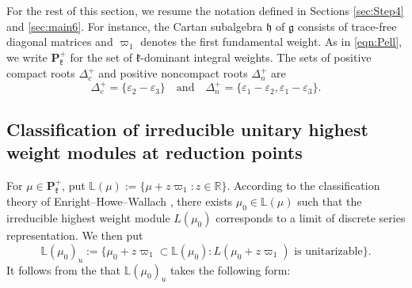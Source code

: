 \documentclass[reqno,11pt]{amsart}
\theoremstyle{remark}
\numberwithin{equation}{section}
\newcommand{\gD}{\Delta}
\newcommand{\eps}{\varepsilon}
\newcommand{\fg}{{\mathfrak g}}
\newcommand{\fh}{{\mathfrak h}}
\newcommand{\fk}{{\mathfrak k}}
\newcommand{\R}{\mathbb{R}}
\begin{document}
For the rest of this section, we resume the notation defined in 
Sections \ref{sec:Step4} and \ref{sec:main6}.
For instance, the Cartan subalgebra $\fh$ of $\fg$ consists of trace-free 
diagonal matrices and
 $\varpi_1$ denotes the first fundamental weight.
As in \eqref{eqn:Pell}, we write 
$\mathbf{P}^+_{\fk}$ for the set of $\fk$-dominant integral weights.
The sets of positive compact roots $\gD^+_c$ 
and positive noncompact roots $\gD^+_n$
are 
\begin{equation*}
\gD^+_c=\{\eps_2-\eps_3\}
\quad 
\text{and}
\quad
\gD^+_n=\{\eps_1-\eps_2, \eps_1-\eps_3\}.
\end{equation*}

\subsection{Classification of irreducible unitary highest weight modules at reduction points}
For $\mu \in \mathbf{P}^+_{\fk}$, put
$\mathbb{L}(\mu):=
\{\mu+z\varpi_1:z \in \R\}$.
According to the classification theory of Enright--Howe--Wallach \cite{EHW83},
there exists $\mu_0 \in \mathbb{L}(\mu)$ such that  
the irreducible highest weight module $L(\mu_0)$
corresponds to a limit of discrete series representation. We then put
\begin{equation*}
\mathbb{L}(\mu_0)_u:=\{\mu_0+z\varpi_1 \subset  \mathbb{L}(\mu_0):
\text{$L(\mu_0+z\varpi_1)$ is unitarizable}\}.
\end{equation*}
It follows from the \cite{EHW83} that $\mathbb{L}(\mu_0)_u$ takes the following 
form:

\vskip 0.3in


\begin{center}
\end{center}
\end{document}
